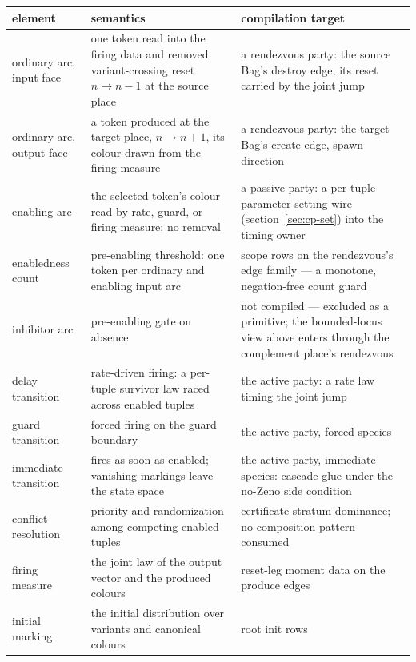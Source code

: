 \begin{center}\small
\begin{tabular}{@{}l>{\raggedright\arraybackslash}p{5.0cm}>{\raggedright\arraybackslash}p{4.7cm}@{}}
\toprule
element & semantics & compilation target \\
\midrule
ordinary arc, input face & one token read into the firing data and
removed: variant-crossing reset $n \to n-1$ at the source place & a
rendezvous party: the source Bag's destroy edge, its reset carried
by the joint jump \\
ordinary arc, output face & a token produced at the target place,
$n \to n+1$, its colour drawn from the firing measure & a rendezvous
party: the target Bag's create edge, spawn direction \\
enabling arc & the selected token's colour read by rate, guard, or
firing measure; no removal & a passive party: a per-tuple
parameter-setting wire (section~\ref{sec:cp-set}) into the timing
owner \\
enabledness count & pre-enabling threshold: one token per ordinary
and enabling input arc & scope rows on the rendezvous's edge
family --- a monotone, negation-free count guard \\
inhibitor arc & pre-enabling gate on absence & not compiled ---
excluded as a primitive; the bounded-locus view above enters
through the complement place's rendezvous \\
delay transition & rate-driven firing: a per-tuple survivor law
raced across enabled tuples & the active party: a rate law timing
the joint jump \\
guard transition & forced firing on the guard boundary & the active
party, forced species \\
immediate transition & fires as soon as enabled; vanishing markings
leave the state space & the active party, immediate species:
cascade glue under the no-Zeno side condition \\
conflict resolution & priority and randomization among competing
enabled tuples & certificate-stratum dominance; no composition
pattern consumed \\
firing measure & the joint law of the output vector and the produced
colours & reset-leg moment data on the produce edges \\
initial marking & the initial distribution over variants and
canonical colours & root init rows \\
\bottomrule
\end{tabular}
\end{center}

